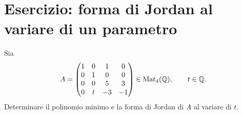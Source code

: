 \documentclass[a4paper]{article}
\begin{document}
\section{Esercizio: forma di Jordan al variare di un parametro}

\begin{radioactive}
\begin{snippetexercise}{}
    Sia
    \[
        A=
        \begin{pmatrix}
            1 & 0 & 1 & 0\\
            0 & 1 & 0 & 0\\
            0 & 0 & 5 & 3\\
            0 & t & -3 & -1
        \end{pmatrix}
        \in \operatorname{Mat}_4(\mathbb{Q}),
        \qquad
        t\in\mathbb{Q}.
    \]
    Determinare il polinomio minimo e la forma di Jordan di \(A\) al variare di \(t\).
\end{snippetexercise}
\end{radioactive}
\end{document}
